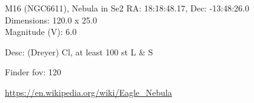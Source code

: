 \begin{block}{M16 (NGC6611), Nebula in Se2}
    RA: 18:18:48.17, Dec: -13:48:26.0 \\ 
    Dimensions: 120.0 x 25.0 \\ 
    Magnitude (V): 6.0


    Desc: (Dreyer) Cl, at least 100 st L \& S 

    Finder fov: 120 

    \url{https://en.wikipedia.org/wiki/Eagle_Nebula} 
\end{block}